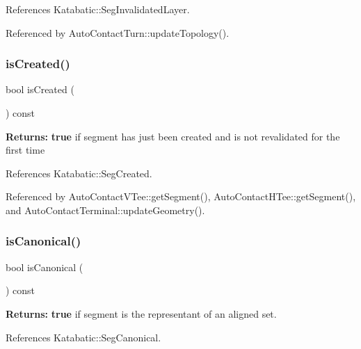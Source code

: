 References Katabatic\+::\+Seg\+Invalidated\+Layer.



Referenced by Auto\+Contact\+Turn\+::update\+Topology().

\mbox{\label{classKatabatic_1_1AutoSegment_af7d9cf1d7581b1cab04cf38c64f0f72a}} 
\subsubsection{\texorpdfstring{is\+Created()}{isCreated()}}
{\footnotesize\ttfamily bool is\+Created (\begin{DoxyParamCaption}{ }\end{DoxyParamCaption}) const\hspace{0.3cm}{\ttfamily [inline]}}

{\bfseries Returns\+:} {\bfseries true} if segment has just been created and is not revalidated for the first time 

References Katabatic\+::\+Seg\+Created.



Referenced by Auto\+Contact\+V\+Tee\+::get\+Segment(), Auto\+Contact\+H\+Tee\+::get\+Segment(), and Auto\+Contact\+Terminal\+::update\+Geometry().

\mbox{\label{classKatabatic_1_1AutoSegment_af6d3008d345195a99e0341f0379c33b7}} 
\subsubsection{\texorpdfstring{is\+Canonical()}{isCanonical()}}
{\footnotesize\ttfamily bool is\+Canonical (\begin{DoxyParamCaption}{ }\end{DoxyParamCaption}) const\hspace{0.3cm}{\ttfamily [inline]}}

{\bfseries Returns\+:} {\bfseries true} if segment is the representant of an aligned set. 

References Katabatic\+::\+Seg\+Canonical.



